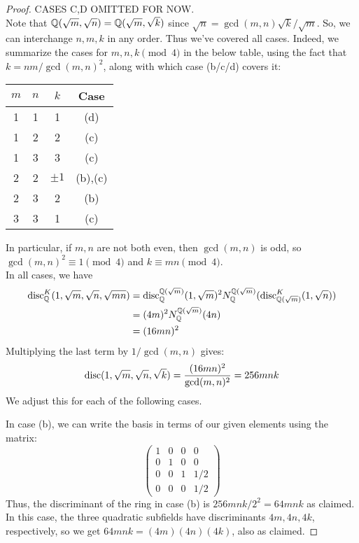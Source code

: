 \begin{proof}
    CASES C,D OMITTED FOR NOW. \\ %

    Note that $\mathbb{Q}(\sqrt{m},\sqrt{n}) = \mathbb{Q}(\sqrt{m},\sqrt{k})$ since $\sqrt{n} = \gcd(m,n)\sqrt{k}/\sqrt{m}$. So, we can interchange $n,m,k$ in any order. Thus we've covered all cases. Indeed, we summarize the cases for $m,n,k \pmod{4}$ in the below table, using the fact that $k = nm/\gcd(m,n)^2$, along with which case (b/c/d) covers it:
    \begin{center} \begin{tabular}{c|c|c|c}
    $m$ & $n$ & $k$ & Case \\
    \hline
    1 & 1 & 1 & (d) \\
    1 & 2 & 2 & (c) \\
    1 & 3 & 3 & (c) \\
    2 & 2 & $\pm 1$ & (b),(c) \\
    2 & 3 & 2 & (b) \\
    3 & 3 & 1 & (c)
    \end{tabular} \end{center}
    In particular, if $m,n$ are not both even, then $\gcd(m,n)$ is odd, so $\gcd(m,n)^2 \equiv 1 \pmod{4}$ and $k \equiv mn \pmod{4}$. \\

    In all cases, we have
    \begin{align*}
    \operatorname{disc}_{\mathbb{Q}}^K(1,\sqrt{m},\sqrt{n},\sqrt{mn})
        &= \operatorname{disc}_{\mathbb{Q}}^{\mathbb{Q}(\sqrt{m})}(1,\sqrt{m})^2N_{\mathbb{Q}}^{\mathbb{Q}(\sqrt{m})}(\operatorname{disc}_{\mathbb{Q}(\sqrt{m})}^K(1,\sqrt{n})) \\
        &= (4m)^2N_{\mathbb{Q}}^{\mathbb{Q}(\sqrt{m})}(4n) \\
        &= (16mn)^2
    \end{align*}
    Multiplying the last term by $1/\gcd(m,n)$ gives:
    \[ \operatorname{disc}(1,\sqrt{m},\sqrt{n},\sqrt{k}) = \frac{(16mn)^2}{\gcd(m,n)^2} = 256mnk \]
    We adjust this for each of the following cases.

    In case (b), we can write the basis in terms of our given elements using the matrix:
    \[ \left(\begin{array}{cccc} 1 & 0 & 0 & 0 \\ 0 & 1 & 0 & 0 \\ 0 & 0 & 1 & 1/2 \\ 0 & 0 & 0 & 1/2 \end{array}\right) \]
    Thus, the discriminant of the ring in case (b) is $256mnk/2^2 = 64mnk$ as claimed. In this case, the three quadratic subfields have discriminants $4m,4n,4k$, respectively, so we get $64mnk = (4m)(4n)(4k)$, also as claimed.


\end{proof}
